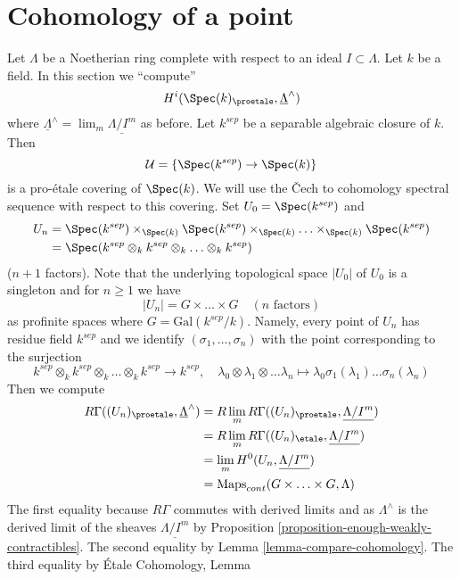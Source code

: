 \section{Cohomology of a point}
\label{section-cohomology-point}

\noindent
Let $\Lambda$ be a Noetherian ring complete with respect to an ideal
$I \subset \Lambda$. Let $k$ be a field. In this section we ``compute''
$$
H^i(\Spec(k)_\proetale, \underline{\Lambda}^\wedge)
$$
where $\underline{\Lambda}^\wedge = \lim_m \underline{\Lambda/I^m}$ as before.
Let $k^{sep}$ be a separable algebraic closure of $k$.
Then
$$
\mathcal{U} = \{\Spec(k^{sep}) \to \Spec(k)\}
$$
is a pro-\'etale covering of $\Spec(k)$. We will use the {\v C}ech
to cohomology spectral sequence with respect to this covering.
Set $U_0 = \Spec(k^{sep})$ and
\begin{align*}
U_n & =
\Spec(k^{sep}) \times_{\Spec(k)}
\Spec(k^{sep}) \times_{\Spec(k)} \ldots
\times_{\Spec(k)} \Spec(k^{sep}) \\
& =
\Spec(k^{sep} \otimes_k k^{sep} \otimes_k \ldots \otimes_k k^{sep})
\end{align*}
($n + 1$ factors). Note that the underlying topological space
$|U_0|$ of $U_0$ is a singleton and for $n \geq 1$ we have
$$
|U_n| = G \times \ldots \times G\quad (n\text{ factors})
$$
as profinite spaces where $G = \text{Gal}(k^{sep}/k)$. Namely, every
point of $U_n$ has residue field $k^{sep}$ and we identify
$(\sigma_1, \ldots, \sigma_n)$ with the point corresponding to the
surjection
$$
k^{sep} \otimes_k k^{sep} \otimes_k \ldots \otimes_k k^{sep}
\longrightarrow k^{sep}, \quad
\lambda_0 \otimes \lambda_1 \otimes \ldots \lambda_n
\longmapsto \lambda_0 \sigma_1(\lambda_1) \ldots \sigma_n(\lambda_n)
$$
Then we compute
\begin{align*}
R\Gamma((U_n)_\proetale, \underline{\Lambda}^\wedge)
& =
R\lim_m R\Gamma((U_n)_\proetale, \underline{\Lambda/I^m}) \\
& =
R\lim_m R\Gamma((U_n)_\etale, \underline{\Lambda/I^m}) \\
& =
\lim_m H^0(U_n, \underline{\Lambda/I^m}) \\
& = 
\text{Maps}_{cont}(G \times \ldots \times G, \Lambda)
\end{align*}
The first equality because $R\Gamma$ commutes with derived limits
and as $\Lambda^\wedge$ is the derived limit of the sheaves
$\underline{\Lambda/I^m}$ by
Proposition \ref{proposition-enough-weakly-contractibles}.
The second equality by Lemma \ref{lemma-compare-cohomology}.
The third equality by \'Etale Cohomology, Lemma
